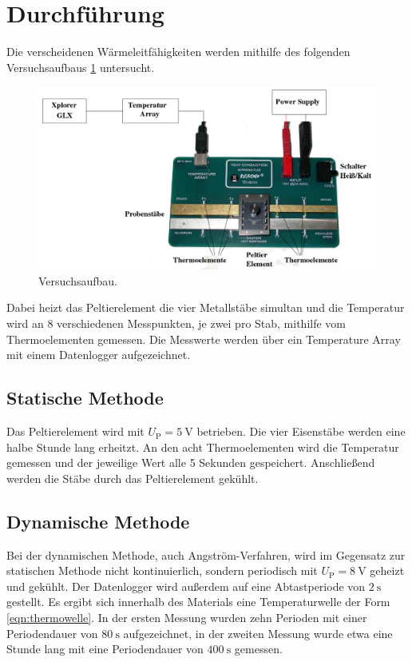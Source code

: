 \section{Durchführung}
\label{sec:Durchführung}
Die verscheidenen Wärmeleitfähigkeiten werden mithilfe des folgenden Versuchsaufbaus \ref{fig:aufbau}
untersucht.
\begin{figure}
    \centering
    \includegraphics[width=\textwidth]{content/aufbau.png}
    \caption{Versuchsaufbau.}
    \label{fig:aufbau}
\end{figure}
Dabei heizt das Peltierelement die vier Metallstäbe simultan und die Temperatur wird an 8
verschiedenen Messpunkten, je zwei pro Stab, mithilfe vom Thermoelementen gemessen. Die
Messwerte werden über ein Temperature Array mit einem Datenlogger aufgezeichnet.
%
\subsection{Statische Methode}
\label{sec:statische Methode}
Das Peltierelement wird mit $U_\text{P}=\SI{5}{\volt}$ betrieben.
Die vier Eisenstäbe werden eine halbe Stunde lang erheitzt.
An den acht Thermoelementen wird die Temperatur gemessen und der jeweilige Wert alle 5 Sekunden gespeichert.
Anschließend werden die Stäbe durch das Peltierelement gekühlt.
%
\subsection{Dynamische Methode}
\label{sec:dynamische Methode}
Bei der dynamischen Methode, auch Angström-Verfahren, wird im Gegensatz zur statischen Methode nicht kontinuierlich, 
sondern periodisch mit $U_\text{P}=\SI{8}{\volt}$ geheizt und gekühlt. 
Der Datenlogger wird außerdem auf eine Abtastperiode von $\SI{2}{\second}$ gestellt.
Es ergibt sich innerhalb des Materials eine Temperaturwelle der Form \eqref{eqn:thermowelle}.
In der ersten Messung wurden zehn Perioden mit einer Periodendauer von $\SI{80}{\second}$ aufgezeichnet, 
in der zweiten Messung wurde etwa eine Stunde lang mit eine Periodendauer von $\SI{400}{\second}$ gemessen.
